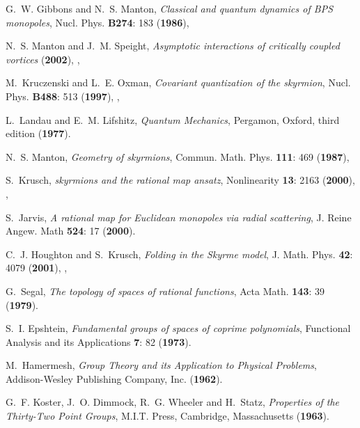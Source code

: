 \documentclass[a4paper,12pt]{article}
\begin{document}
\begin{small}
\begin{thebibliography}{10}
G.~W. Gibbons and N.~S. Manton, {\em Classical and quantum dynamics of {{BPS}}
  monopoles\/}, Nucl. Phys. {\bf B274}: 183 ({\bf 1986}),

N.~S. Manton and J.~M. Speight, {\em Asymptotic interactions of critically
  coupled vortices\/}  ({\bf 2002}), {},

M.~Kruczenski and L.~E. Oxman, {\em Covariant quantization of the skyrmion\/},
  Nucl. Phys. {\bf B488}: 513 ({\bf 1997}), {},

L.~Landau and E.~M. Lifshitz, {\em Quantum Mechanics\/}, Pergamon, Oxford,
  third edition
 ({\bf 1977}).

N.~S. Manton, {\em Geometry of skyrmions\/}, Commun. Math. Phys. {\bf 111}: 469
  ({\bf 1987}),

S.~Krusch, {\em {}\coordHE{} skyrmions and the rational map ansatz\/}, Nonlinearity
  {\bf 13}: 2163 ({\bf 2000}), {},

S.~Jarvis, {\em A rational map for {E}uclidean monopoles via radial
  scattering\/}, J. Reine Angew. Math {\bf 524}: 17
 ({\bf 2000}).

C.~J. Houghton and S.~Krusch, {\em Folding in the {S}kyrme model\/}, J. Math.
  Phys. {\bf 42}: 4079 ({\bf 2001}), {},

G.~Segal, {\em The topology of spaces of rational functions\/}, Acta Math. {\bf
  143}: 39
 ({\bf 1979}).

S.~I. Epshtein, {\em Fundamental groups of spaces of coprime polynomials\/},
  Functional Analysis and its Applications {\bf 7}: 82
 ({\bf 1973}).

M.~Hamermesh, {\em Group Theory and its Application to Physical Problems\/},
  Addison-Wesley Publishing Company, Inc.
 ({\bf 1962}).

G.~F. Koster, J.~O. Dimmock, R.~G. Wheeler and H.~Statz, {\em Properties of the
  Thirty-Two Point Groups\/}, M.I.T. Press, Cambridge, Massachusetts
 ({\bf 1963}).


\end{thebibliography}
\end{small}
\end{document}
